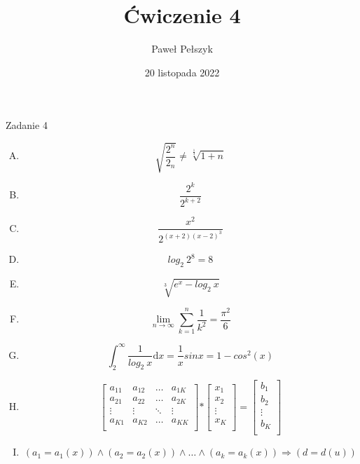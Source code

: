 \documentclass[12pt, letterpaper, titlepage]{article}
\title{Ćwiczenie 4}
\author{Paweł Pełszyk}
\date{20 listopada 2022}
\begin{document}
\maketitle

Zadanie 4
\begin{enumerate}[A.]

\item  $$ \sqrt{ \frac{2^{n}}{2_n}} \neq \sqrt[\frac{1}{3}]{1+n} $$

\item $$ \frac{2^{k}}{2^{k+2}}$$

\item $$ \frac{x^{2}} {2^{(x+2)(x-2)^{3}}}$$

\item $$ log_2 \ 2^{8}=8 $$

\item $$ \sqrt[3]{e^{x}-log_2 \ x}$$

\item $$ \lim_{n\to\infty} \sum_{k=1}^{n} \frac{1}{k^{2}}=\frac{\pi^{2}}{6}  $$

\item $$ \int_{2}^{\infty} \frac{1}{log_{2} \ x }\mathrm{d} x = \frac{1}{x}sin x = 1- cos^{2}(x) $$

\item $$ \mathbf{}
\left[ \begin{array}{cccc}

a_{11} & a_{12} & \ldots & a_{1K} \\
a_{21} & a_{22} & \ldots & a_{2K} \\
\vdots & \vdots & \ddots & \vdots \\
a_{K1} & a_{K2} & \ldots & a_{KK} \\
\end{array} \right]
\mathbf{*}
\left[ \begin{array}{c}
x_{1} \\
x_{2} \\
\vdots \\
x_{K} \\
\end{array} \right]
\mathbf{=}
\left[ \begin{array}{c}
b_{1} \\
b_{2} \\
\vdots \\
b_{K} \\
\end{array} \right]
$$

\item $$(a_{1} = a_{1}(x)) \wedge (a_{2}=a_{2}(x)) \wedge \ldots \wedge (a_{k} = a_{k}(x)) \Rightarrow (d=d(u)) $$


\end{enumerate}
\end{document}
